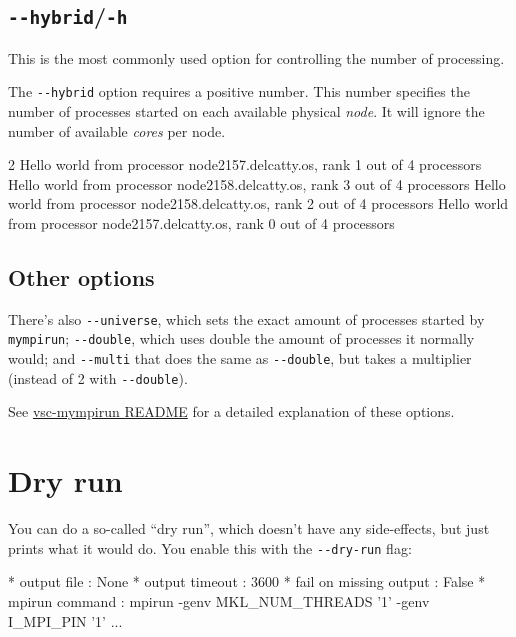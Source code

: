 \subsection{\texttt{-{}-hybrid}/\texttt{-h}}

This is the most commonly used option for controlling the number of processing.

The \lstinline|--hybrid| option requires a positive number. This number specifies
the number of processes started on each available physical \emph{node}. It will ignore
the number of available \emph{cores} per node.

\begin{prompt}
2
Hello world from processor node2157.delcatty.os, rank 1 out of 4 processors
Hello world from processor node2158.delcatty.os, rank 3 out of 4 processors
Hello world from processor node2158.delcatty.os, rank 2 out of 4 processors
Hello world from processor node2157.delcatty.os, rank 0 out of 4 processors
\end{prompt}

\subsection{Other options}

There's also \lstinline|--universe|, which sets the exact amount of processes started by \lstinline|mympirun|;
\lstinline|--double|, which uses double the amount of processes it normally would;
and \lstinline|--multi| that does the same as \lstinline|--double|, but takes a multiplier
(instead of 2 with \lstinline|--double|).

See \href{https://github.com/hpcugent/vsc-mympirun/blob/master/README.md}{vsc-mympirun README}
for a detailed explanation of these options.

\section{Dry run}

You can do a so-called ``dry run'', which doesn't have any side-effects, but just
prints what it would do. You enable this with the \lstinline|--dry-run| flag:

\begin{prompt}
* output file            : None
* output timeout         : 3600
* fail on missing output : False
* mpirun command         : mpirun -genv MKL_NUM_THREADS '1' -genv I_MPI_PIN '1' ...
\end{prompt}

